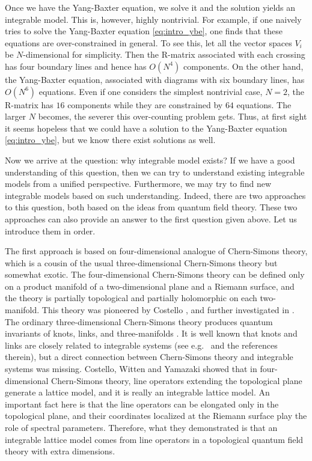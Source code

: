 Once we have the Yang-Baxter equation, we solve it and the solution yields an
integrable model.
This is, however, highly nontrivial.
For example, if one naively tries to solve the Yang-Baxter equation \eqref{eq:intro_ybe},
one finds that these equations are over-constrained in general.
To see this, let all the vector spaces $V_i$ be $N$-dimensional for simplicity.
Then the R-matrix associated with each crossing has four boundary lines and hence
has $O(N^4)$ components.
On the other hand, the Yang-Baxter equation, associated with diagrams with six boundary lines,
has $O(N^6)$ equations.
Even if one considers the simplest nontrivial case, $N=2$, the R-matrix has $16$ components
while they are constrained by $64$ equations.
The larger $N$ becomes, the severer this over-counting problem gets.
Thus, at first sight it seems hopeless that we could have a solution to the Yang-Baxter equation
\eqref{eq:intro_ybe},
but we know there exist solutions as well.


Now we arrive at the question: why integrable model exists?
If we have a good understanding of this question, then we can try to understand existing
integrable models from a unified perspective.
Furthermore, we may try to find new integrable models based on such understanding.
%
Indeed, there are two approaches to this question, both based on the ideas from quantum
field theory.
These two approaches can also provide an answer to the first question given above.
Let us introduce them in order.


The first approach is based on four-dimensional analogue of Chern-Simons theory,
which is a cousin of the usual three-dimensional Chern-Simons theory but somewhat exotic.
The four-dimensional Chern-Simons theory can be defined only on a product manifold of a two-dimensional plane
and a Riemann surface, and the theory is partially topological and partially holomorphic on each two-manifold.
This theory was pioneered by Costello \cite{Costello:2013zra,Costello:2013sla},
and further investigated in \cite{Witten:2016spx,Costello:2017dso,Costello:2018gyb,Costello:2019tri}.
The ordinary three-dimensional Chern-Simons theory produces
quantum invariants of knots, links, and three-manifolds \cite{Witten:1988hf}.
It is well known that knots and links are closely related to integrable systems
(see e.g.~\cite{Wadati:1989ud} and the references therein),
but a direct connection between Chern-Simons theory and integrable systems was missing.
Costello, Witten and Yamazaki showed that in four-dimensional Chern-Simons theory, line operators
extending the topological plane generate a lattice model, and it is really an integrable lattice model.
An important fact here is that the line operators can be elongated only in the topological plane,
and their coordinates localized at the Riemann surface play the role of spectral parameters.
Therefore, what they demonstrated is that an integrable lattice model comes from line operators in a topological
quantum field theory with extra dimensions.


